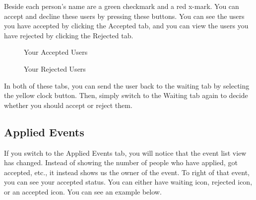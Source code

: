 \documentclass[10pt]{article}
\newcommand{\fancysub}[2] {{\color{primary}\subsection{#1} \label{sec:#2}}}
\begin{document}
			Beside each person's name are a green checkmark and a red x-mark. You can accept and decline these users by pressing these buttons. You can see the users you have accepted by clicking the Accepted tab, and you can view the users you have rejected by clicking the Rejected tab.
			
			\begin{figure}[H]
				\centering
				\caption{Your Accepted Users}
				\label{fig:awesome_image}
			\end{figure}
			
			\begin{figure}[H]
				\centering
				\caption{Your Rejected Users}
				\label{fig:awesome_image}
			\end{figure}
		
			In both of these tabs, you can send the user back to the waiting tab by selecting the yellow clock button. Then, simply switch to the Waiting tab again to decide whether you should accept or reject them.
		
		\clearpage
		\fancysub{Applied Events}{aevents}
			If you switch to the Applied Events tab, you will notice that the event list view has changed. Instead of showing the number of people who have applied, got accepted, etc., it instead shows us the owner of the event. To right of that event, you can see your accepted status. You can either have waiting icon, rejected icon, or an accepted icon. You can see an example below.
			
\end{document}
